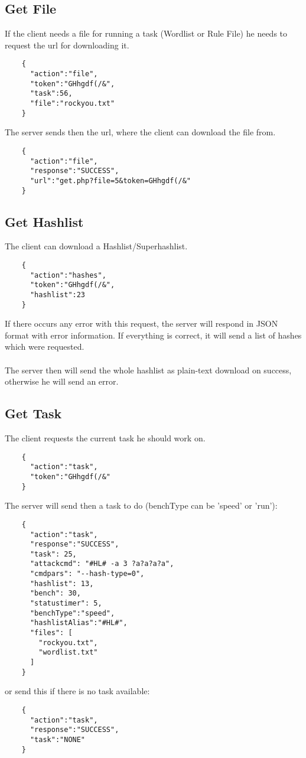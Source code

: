 \documentclass{article}
\begin{document}
	\subsection*{Get File}
	If the client needs a file for running a task (Wordlist or Rule File) he needs to request the url for downloading it.
	\begin{verbatim}
	{
	  "action":"file",
	  "token":"GHhgdf(/&",
	  "task":56,
	  "file":"rockyou.txt"
	}
	\end{verbatim}
	The server sends then the url, where the client can download the file from.
	\begin{verbatim}
	{
	  "action":"file",
	  "response":"SUCCESS",
	  "url":"get.php?file=5&token=GHhgdf(/&"
	}
	\end{verbatim}
	
	\subsection*{Get Hashlist}
	The client can download a Hashlist/Superhashlist.
	\begin{verbatim}
	{
	  "action":"hashes",
	  "token":"GHhgdf(/&",
	  "hashlist":23
	}
	\end{verbatim}
	If there occurs any error with this request, the server will respond in JSON format with error information. If everything is correct, it will send a list of hashes which were requested.\\\\
	The server then will send the whole hashlist as plain-text download on success, otherwise he will send an error.
	
	\subsection*{Get Task}
	The client requests the current task he should work on.
	\begin{verbatim}
	{
	  "action":"task",
	  "token":"GHhgdf(/&"
	}
	\end{verbatim}
	The server will send then a task to do (benchType can be 'speed' or 'run'):
	\begin{verbatim}
	{
	  "action":"task",
	  "response":"SUCCESS",
	  "task": 25,
	  "attackcmd": "#HL# -a 3 ?a?a?a?a",
	  "cmdpars": "--hash-type=0",
	  "hashlist": 13,
	  "bench": 30,
	  "statustimer": 5,
	  "benchType":"speed",
	  "hashlistAlias":"#HL#",
	  "files": [
	    "rockyou.txt",
	    "wordlist.txt"
	  ]
	}
	\end{verbatim}
	or send this if there is no task available:
	\begin{verbatim}
	{
	  "action":"task",
	  "response":"SUCCESS",
	  "task":"NONE"
	}
	\end{verbatim}
	
\end{document}
